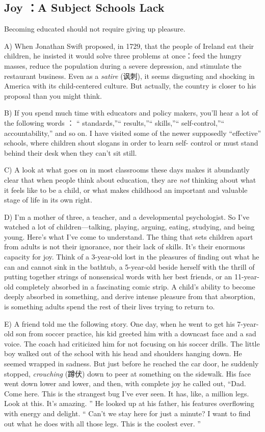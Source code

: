 \documentclass[UTF8,11pt]{ctexart}
\begin{document}
\subsection*{\textbf{Joy} ：\textbf{A Subject Schools Lack}}


Becoming educated should not require giving up pleasure.


A) When Jonathan Swift proposed, in 1729, that the people of Ireland eat their children, he insisted it would solve three problems at once：feed the hungry masses, reduce the population during a severe depression, and stimulate the restaurant business. Even as a\textit{ satire} (讽刺), it seems disgusting and shocking in America with its child-centered culture. But actually, the country is closer to his proposal than you might think.


B) If you spend much time with educators and policy makers, you’ll hear a lot of the following words ： “ standards,”“ results,”“ skills,”“ self-control,”“ accountability,” and so on. I have visited some of the newer supposedly “effective” schools, where children shout slogans in order to learn self- control or must stand behind their desk when they can’t sit still.


C) A look at what goes on in most classrooms these days makes it abundantly clear that when people think about education, they are\textit{ not} thinking about what it feels like to be a child, or what makes childhood an important and valuable stage of life in its own right.


D) I’m a mother of three, a teacher, and a developmental psychologist. So I’ve watched a lot of children—talking, playing, arguing, eating, studying, and being young. Here’s what I’ve come to understand. The thing that sets children apart from adults is not their ignorance, nor their lack of skills. It’s their enormous capacity for joy. Think of a 3-year-old lost in the pleasures of finding out what he can and cannot sink in the bathtub, a 5-year-old beside herself with the thrill of putting together strings of nonsensical words with her best friends, or an 11-year-old completely absorbed in a fascinating comic strip. A child’s ability to become deeply absorbed in something, and derive intense pleasure from that absorption, is something adults spend the rest of their lives trying to return to.


E) A friend told me the following story. One day, when he went to get his 7-year-old son from soccer practice, his kid greeted him with a downcast face and a sad voice. The coach had criticized him for not focusing on his soccer drills. The little boy walked out of the school with his head and shoulders hanging down. He seemed wrapped in sadness. But just before he reached the car door, he suddenly stopped,\textit{ crouching} (蹲伏) down to peer at something on the sidewalk. His face went down lower and lower, and then, with complete joy he called out, “Dad. Come here. This is the strangest bug I’ve ever seen. It has, like, a million legs. Look at this. It’s amazing. ” He looked up at his father, his features overflowing with energy and delight. “ Can’t we stay here for just a minute? I want to find out what he does with all those legs. This is the coolest ever. ”
\end{document}
